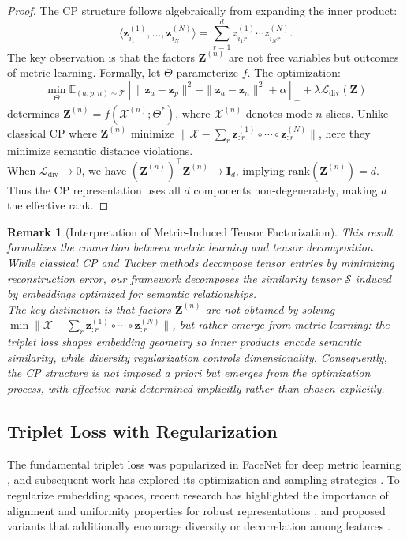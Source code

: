 \documentclass[a4paper,12pt,reqno]{amsart}
\newtheorem{remark}[theorem]{\textbf{Remark}}
\theoremstyle{definition}
\theoremstyle{remark}
\begin{document}
	\begin{proof}
		The CP structure follows algebraically from expanding the inner product:
		\[
		\langle \mathbf{z}_{i_1}^{(1)}, \dots, \mathbf{z}_{i_N}^{(N)} \rangle = \sum_{r=1}^d z^{(1)}_{i_1 r} \cdots z^{(N)}_{i_N r}.
		\]
		The key observation is that the factors $\mathbf{Z}^{(n)}$ are not free variables but outcomes of metric learning. Formally, let $\Theta$ parameterize $f$. The optimization:
		\[
		\min_{\Theta} \mathbb{E}_{(a,p,n)\sim\mathcal{T}} \left[ \|\mathbf{z}_a - \mathbf{z}_p\|^2 - \|\mathbf{z}_a - \mathbf{z}_n\|^2 + \alpha \right]_+ + \lambda \mathcal{L}_{\text{div}}(\mathbf{Z})
		\]
		determines $\mathbf{Z}^{(n)} = f(\mathcal{X}^{(n)}; \Theta^*)$, where $\mathcal{X}^{(n)}$ denotes mode-$n$ slices. Unlike classical CP where $\mathbf{Z}^{(n)}$ minimize $\|\mathcal{X} - \sum_r \mathbf{z}_{:r}^{(1)} \circ \cdots \circ \mathbf{z}_{:r}^{(N)}\|$, here they minimize semantic distance violations.\\
		When $\mathcal{L}_{\text{div}} \to 0$, we have $(\mathbf{Z}^{(n)})^\top\mathbf{Z}^{(n)} \to \mathbf{I}_d$, implying $\text{rank}(\mathbf{Z}^{(n)}) = d$. Thus the CP representation uses all $d$ components non-degenerately, making $d$ the effective rank.
\end{proof}
\begin{remark}[Interpretation of Metric-Induced Tensor Factorization]
	This result formalizes the connection between metric learning and tensor decomposition. While classical CP and Tucker methods decompose tensor entries by minimizing reconstruction error, our framework decomposes the similarity tensor $\mathcal{S}$ induced by embeddings optimized for semantic relationships. \\
	The key distinction is that factors $\mathbf{Z}^{(n)}$ are not obtained by solving $\min \|\mathcal{X} - \sum_r \mathbf{z}_{:r}^{(1)} \circ \cdots \circ \mathbf{z}_{:r}^{(N)}\|$, but rather emerge from metric learning: the triplet loss shapes embedding geometry so inner products encode semantic similarity, while diversity regularization controls dimensionality. Consequently, the CP structure is not imposed a priori but emerges from the optimization process, with effective rank determined implicitly rather than chosen explicitly.
	\end{remark}
\subsection{Triplet Loss with Regularization}
The fundamental triplet loss was popularized in FaceNet for deep metric learning \cite{schroff2015facenet}, and subsequent work has explored its optimization and sampling strategies \cite{wu2017sampling}. To regularize embedding spaces, recent research has highlighted the importance of alignment and uniformity properties for robust representations \cite{wang2020understanding}, and proposed variants that additionally encourage diversity or decorrelation among features \cite{mo2022rethinking}.
\end{document}

